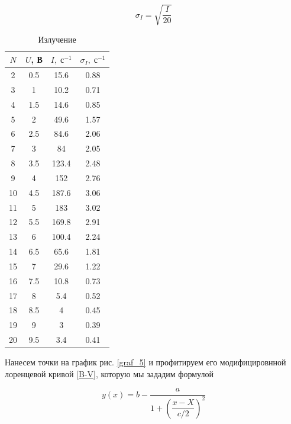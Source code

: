 \documentclass[12pt]{kiarticle}
\begin{document}
	\begin{equation}\label{}
	\sigma_I = \sqrt{\dfrac{I}{20}}
	\end{equation}
	
	 \begin{table}[h]
	 	\caption{Излучение}
	 	\begin{center}
	 		\begin{tabular}{|c|c|c|c|}
	 			\hline
	 			$ N  $ & $ U $, В &  $ I, \; с^{-1} $ & $ \sigma_I, \; с^{-1} $  \\
	 			\hline
	 			2 & 0.5 & 15.6 & 0.88 \\
	 			3 & 1 & 10.2 & 0.71 \\
	 			4 & 1.5 & 14.6 & 0.85 \\
	 			5 & 2 & 49.6 & 1.57 \\
	 			6 & 2.5 & 84.6 & 2.06 \\
	 			7 & 3 & 84 & 2.05 \\
	 			8 & 3.5 & 123.4 & 2.48 \\
	 			9 & 4 & 152 & 2.76 \\
	 			10 & 4.5 & 187.6 & 3.06 \\
	 			11 & 5 & 183 & 3.02 \\
	 			12 & 5.5 & 169.8 & 2.91 \\
	 			13 & 6 & 100.4 & 2.24 \\
	 			14 & 6.5 & 65.6 & 1.81 \\
	 			15 & 7 & 29.6 & 1.22 \\
	 			16 & 7.5 & 10.8 & 0.73 \\
	 			17 & 8 & 5.4 & 0.52 \\
	 			18 & 8.5 & 4 & 0.45 \\
	 			19 & 9 & 3 & 0.39 \\
	 			20 & 9.5 & 3.4 & 0.41 \\
	 			\hline
	 		\end{tabular}
	 	\end{center}
	 	\label{table_5}
	 \end{table}
 
 Нанесем точки на график рис. \ref{graf_5} и профитируем его модифицировнной лоренцевой кривой \eqref{B-V}, которую мы зададим формулой
 	
 	\begin{equation}\label{yotx}
 y (x) = b - \dfrac{a}{1 + \left( \dfrac{x-X}{c/2}\right) ^2}
 \end{equation}
 
\end{document}
